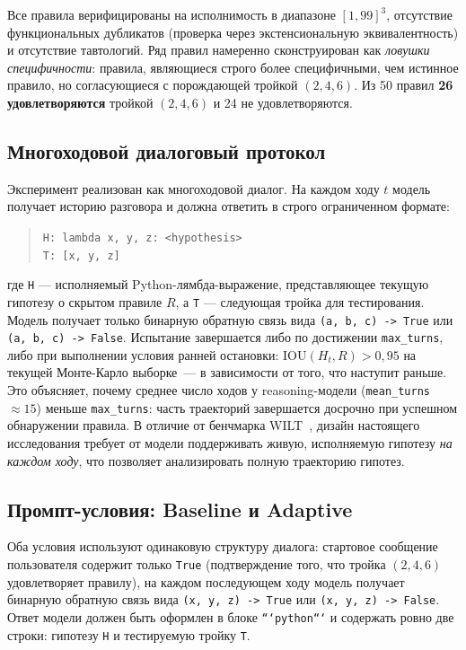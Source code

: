 Все правила верифицированы на исполнимость в диапазоне $[1, 99]^3$, отсутствие функциональных дубликатов (проверка через экстенсиональную эквивалентность) и отсутствие тавтологий. Ряд правил намеренно сконструирован как \textit{ловушки специфичности}: правила, являющиеся строго более специфичными, чем истинное правило, но согласующиеся с порождающей тройкой $(2, 4, 6)$. Из 50 правил \textbf{26 удовлетворяются} тройкой $(2, 4, 6)$ и 24 не удовлетворяются.

\subsection{Многоходовой диалоговый протокол}

Эксперимент реализован как многоходовой диалог. На каждом ходу $t$ модель получает историю разговора и должна ответить в строго ограниченном формате:

\begin{quote}
\texttt{H: lambda x, y, z: <hypothesis>}\\
\texttt{T: [x, y, z]}
\end{quote}

где \texttt{H} --- исполняемый Python-лямбда-выражение, представляющее текущую гипотезу о скрытом правиле $R$, а \texttt{T} --- следующая тройка для тестирования. Модель получает только бинарную обратную связь вида \texttt{(a, b, c) -> True} или \texttt{(a, b, c) -> False}. Испытание завершается либо по достижении \texttt{max\_turns}, либо при выполнении условия ранней остановки: $\text{IOU}(H_t, R) > 0{,}95$ на текущей Монте-Карло выборке~--- в зависимости от того, что наступит раньше. Это объясняет, почему среднее число ходов у reasoning-модели (\texttt{mean\_turns} $\approx 15$) меньше \texttt{max\_turns}: часть траекторий завершается досрочно при успешном обнаружении правила. В отличие от бенчмарка WILT~\cite{banatt2024wilt}, дизайн настоящего исследования требует от модели поддерживать живую, исполняемую гипотезу \textit{на каждом ходу}, что позволяет анализировать полную траекторию гипотез.

\subsection{Промпт-условия: Baseline и Adaptive}

Оба условия используют одинаковую структуру диалога: стартовое сообщение пользователя содержит только \texttt{True} (подтверждение того, что тройка $(2, 4, 6)$ удовлетворяет правилу), на каждом последующем ходу модель получает бинарную обратную связь вида \texttt{(x, y, z) -> True} или \texttt{(x, y, z) -> False}. Ответ модели должен быть оформлен в блоке \texttt{```python```} и содержать ровно две строки: гипотезу \texttt{H} и тестируемую тройку \texttt{T}.


